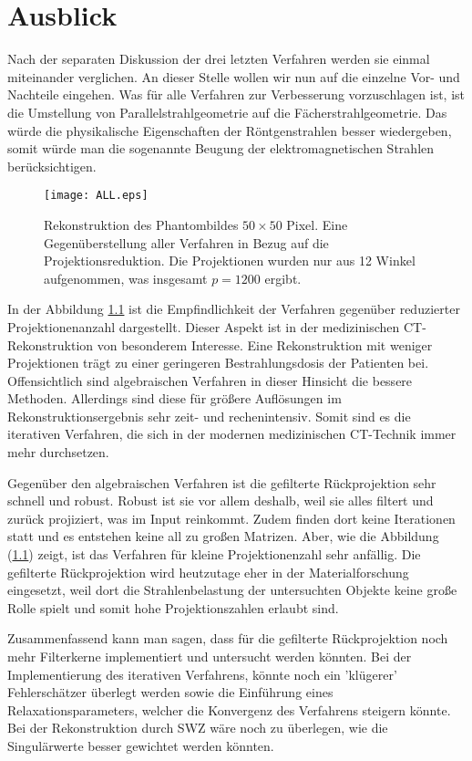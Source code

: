 \chapter{Ausblick}
\label{cha:4}

Nach der separaten Diskussion der drei letzten Verfahren werden sie einmal miteinander verglichen. An dieser Stelle wollen wir nun auf die einzelne Vor- und Nachteile eingehen. Was für alle Verfahren zur Verbesserung vorzuschlagen ist, ist die Umstellung von Parallelstrahlgeometrie auf die Fächerstrahlgeometrie. Das würde die physikalische Eigenschaften der Röntgenstrahlen besser wiedergeben, somit würde man die sogenannte Beugung der elektromagnetischen Strahlen berücksichtigen.
\begin{figure}[!h]
	\centering
	\texttt{[image: ALL.eps]}
	\caption{Rekonstruktion des Phantombildes $50\times50$ Pixel. Eine Gegenüberstellung aller Verfahren in Bezug auf die Projektionsreduktion. Die Projektionen wurden nur aus 12 Winkel aufgenommen, was insgesamt $p = 1200$ ergibt.}
	\label{fig:3.16}
\end{figure}

In der Abbildung \ref{fig:3.16} ist die Empfindlichkeit der Verfahren gegenüber reduzierter Projektionenanzahl dargestellt. Dieser Aspekt ist in der medizinischen CT- Rekonstruktion von besonderem Interesse. Eine Rekonstruktion mit weniger Projektionen trägt zu einer geringeren Bestrahlungsdosis der Patienten bei. Offensichtlich sind algebraischen Verfahren in dieser Hinsicht die bessere Methoden. Allerdings sind diese für größere Auflösungen im Rekonstruktionsergebnis sehr zeit- und rechenintensiv. Somit sind es die iterativen Verfahren, die sich in der modernen medizinischen CT-Technik immer mehr durchsetzen.

Gegenüber den algebraischen Verfahren ist die gefilterte Rückprojektion sehr schnell und robust. Robust ist sie vor allem deshalb, weil sie alles filtert und zurück projiziert, was im Input reinkommt. Zudem finden dort keine Iterationen statt und es entstehen keine all zu großen Matrizen. Aber, wie die Abbildung (\ref{fig:3.16}) zeigt, ist das Verfahren für kleine Projektionenzahl sehr anfällig. Die gefilterte Rückprojektion wird heutzutage eher in der Materialforschung eingesetzt, weil dort die Strahlenbelastung der untersuchten Objekte keine große Rolle spielt und somit hohe Projektionszahlen erlaubt sind.

Zusammenfassend kann man sagen, dass für die gefilterte Rückprojektion noch mehr Filterkerne implementiert und untersucht werden könnten. Bei der Implementierung des iterativen Verfahrens, könnte noch ein 'klügerer' Fehlerschätzer überlegt werden sowie die Einführung eines Relaxationsparameters, welcher die Konvergenz des Verfahrens steigern könnte. Bei der Rekonstruktion durch SWZ wäre noch zu überlegen, wie die Singulärwerte besser gewichtet werden könnten.
